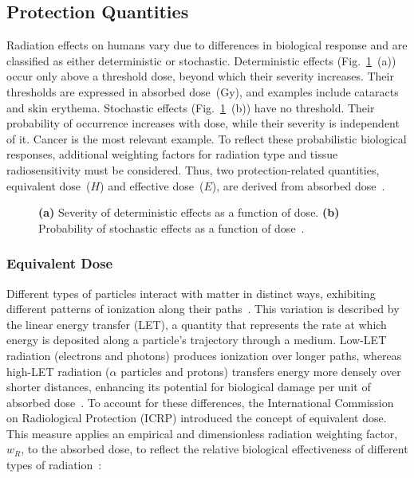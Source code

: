 \subsection{Protection Quantities}

Radiation effects on humans vary due to differences in bio\-logical response and are classified as either deterministic or stochastic. Deterministic effects (Fig.~\ref{fig:effects}~(a)) occur only above a threshold dose, beyond which their severity increases. Their thresholds are expressed in absorbed dose~(Gy), and examples include cataracts and skin erythema. Stochastic effects (Fig.~\ref{fig:effects}~(b)) have no threshold. Their probability of occurrence increases with dose, while their severity is independent of it. Cancer is the most relevant example. To reflect these probabilistic biological responses, additional weighting factors for radiation type and tissue radiosensitivity must be considered. Thus, two protection-related quantities, equivalent dose~($H$) and effective dose~($E$), are derived from absorbed dose~\cite{13,14}.
\begin{figure}[H]
  \centering
  
  \caption[Deterministic and stochastic effects.]{\textbf{(a)} Severity of deterministic effects as a function of dose. \textbf{(b)} Probability of stochastic effects as a function of dose~\cite{13}.}
  \label{fig:effects}
\end{figure}

\subsubsection{Equivalent Dose}
Different types of particles interact with matter in distinct ways, exhibiting different patterns of ionization along their paths~\cite{12}. This variation is described by the linear energy transfer (LET), a quantity that represents the rate at which energy is deposited along a particle's trajectory through a medium. Low-LET radiation (electrons and photons) produces ionization over longer paths, whereas high-LET radiation ($\alpha$ particles and protons) transfers energy more densely over shorter distances, enhancing its potential for biological damage per unit of absorbed dose~\cite{6}. To account for these differences, the International Commission on Radiological Protection (ICRP) introduced the concept of equivalent dose. This measure applies an empirical and dimensionless radiation weighting factor, $w_R$, to the absorbed dose, to reflect the relative biological effectiveness of different types of radiation~\cite{6,14}:
 

